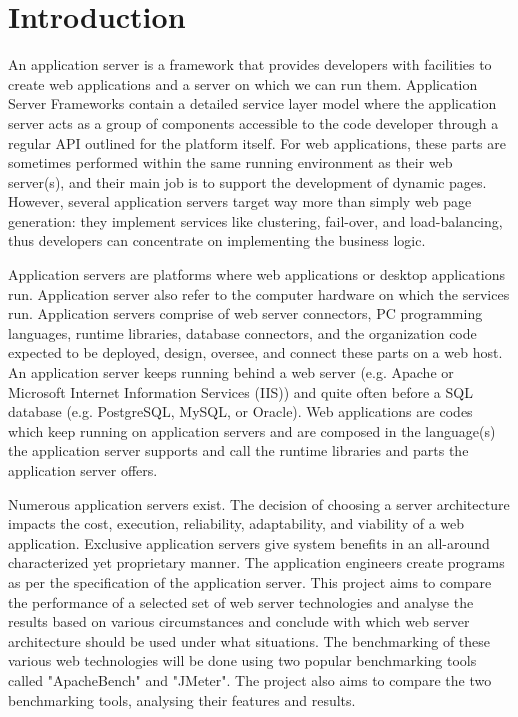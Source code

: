 \documentclass[../thesis.tex]{subfiles}
\begin{document}
\section{Introduction}
An application server is a framework that provides developers with facilities to create web applications and a server on which we can run them. Application Server Frameworks contain a detailed service layer model where the application server acts as a group of components accessible to the code developer through a regular API outlined for the platform itself. For web applications, these parts are sometimes performed within the same running environment as their web server(s), and their main job is to support the development of dynamic pages. However, several application servers target way more than simply web page generation: they implement services like clustering, fail-over, and load-balancing, thus developers can concentrate on implementing the business logic.
\linebreak

Application servers are platforms where web applications or desktop applications run. Application server also refer to the computer hardware on which the services run. Application servers comprise of web server connectors, PC programming languages, runtime libraries, database connectors, and the organization code expected to be deployed, design, oversee, and connect these parts on a web host. An application server keeps running behind a web server (e.g. Apache or Microsoft Internet Information Services (IIS)) and quite often before a SQL database (e.g. PostgreSQL, MySQL, or Oracle). Web applications are codes which keep running on application servers and are composed in the language(s) the application server supports and call the runtime libraries and parts the application server offers.
\linebreak

Numerous application servers exist. The decision of choosing a server architecture impacts the cost, execution, reliability, adaptability, and viability of a web application. Exclusive application servers give system benefits in an all-around characterized yet proprietary manner. The application engineers create programs as per the specification of the application server. This project aims to compare the performance of a selected set of web server technologies and analyse the results based on various circumstances and conclude with which web server architecture should be used under what situations. The benchmarking of these various web technologies will be done using two popular benchmarking tools called "ApacheBench" and "JMeter". The project also aims to compare the two benchmarking tools, analysing their features and results.
\clearpage
\end{document}

